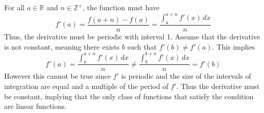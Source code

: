 \documentclass{report}
\begin{document}
\bigskip

For all $a \in \mathbb{R}$ and $n \in \mathbb{Z^+}$, the function must have
\[
	f'(a) 
	= \frac{f(a+n)-f(a)}{n} 
	= \frac{\int_a^{a+n} f'(x) \,dx}{n}
\]
Thus, the derivative must be periodic with interval 1.
Assume that the derivative is not constant,
meaning there exists $b$ such that $f'(b) \neq f'(a)$.
This implies
\[
	f'(a) 
	= \frac{\int_a^{a+n} f'(x) \,dx}{n} 
	\neq \frac{\int_b^{b+n} f'(x) \,dx}{n}
	= f'(b)
\]
However this cannot be true since $f'$ is periodic and 
the size of the intervals of integration are equal and a multiple of the period of $f'$.
Thus the derivative must be constant, 
implying that the only class of functions that satisfy the condition are linear functions.
\end{document}
